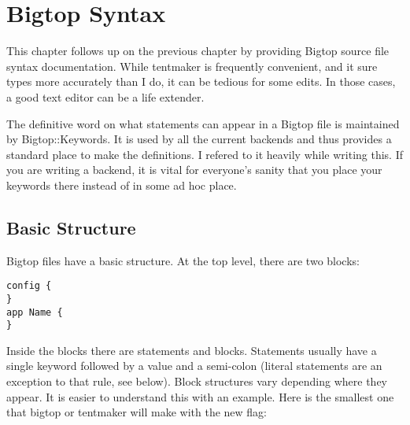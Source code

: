 \chapter{Bigtop Syntax}
\label{chap:bigsyntax}

This chapter follows up on the previous chapter by providing Bigtop source
file syntax documentation.  While tentmaker is frequently convenient, and
it sure types more accurately than I do, it can be tedious for some edits.
In those cases, a good text editor can be a life extender.

The definitive word on what statements can appear in a Bigtop file is
maintained by Bigtop::Keywords.  It is used by all the current backends
and thus provides a standard place to make the definitions.  I refered
to it heavily while writing this.  If you are writing a backend, it is
vital for everyone's sanity that you place your keywords there instead
of in some ad hoc place.

\section{Basic Structure}

Bigtop files have a basic structure.  At the top level, there are two
blocks:

\begin{verbatim}
config {
}
app Name {
}
\end{verbatim}

Inside the blocks there are statements and blocks.  Statements usually have
a single keyword followed by a value and a semi-colon (literal statements
are an exception to that rule, see below).  Block structures vary depending
where they appear.  It is easier to understand this with an example.
Here is the smallest one that bigtop or tentmaker will make with the new
flag:

